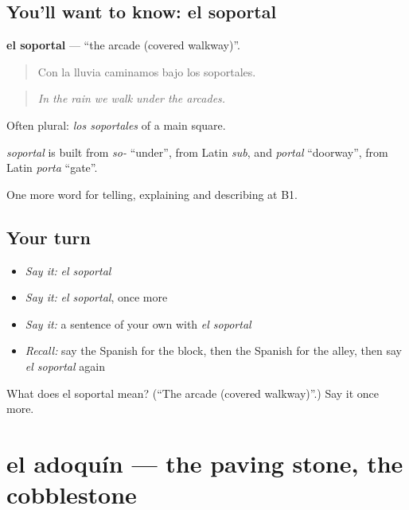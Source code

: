 \subsection*{You'll want to know: el soportal}
\textbf{el soportal} — \textquotedblleft{}the arcade (covered walkway)\textquotedblright{}.

\begin{quote}
Con la lluvia caminamos bajo los soportales.
\end{quote}

\begin{quote}
\emph{In the rain we walk under the arcades.}
\end{quote}

Often plural: \emph{los soportales} of a main square.

\begin{cousinweb}
\emph{soportal} is built from \emph{so-} \textquotedblleft{}under\textquotedblright{}, from Latin \emph{sub}, and \emph{portal} \textquotedblleft{}doorway\textquotedblright{}, from Latin \emph{porta} \textquotedblleft{}gate\textquotedblright{}.
\end{cousinweb}

\begin{grammarlens}[title={What you've built}]
One more word for telling, explaining and describing at B1.
\end{grammarlens}

\subsection*{Your turn}
\begin{itemize}
\raggedright
  \item \emph{Say it:} \emph{el soportal}
  \item \emph{Say it:} \emph{el soportal}, once more
  \item \emph{Say it:} a sentence of your own with \emph{el soportal}
  \item \emph{Recall:} say the Spanish for the block, then the Spanish for the alley, then say \emph{el soportal} again
\end{itemize}

\begin{tcolorbox}[breakable,colback=teal!4,colframe=teal!35!black,title={Before you move on}]
What does el soportal mean? (\textquotedblleft{}The arcade (covered walkway)\textquotedblright{}.) Say it once more.
\end{tcolorbox}
\section[el adoquín]{el adoquín — the paving stone, the cobblestone}

